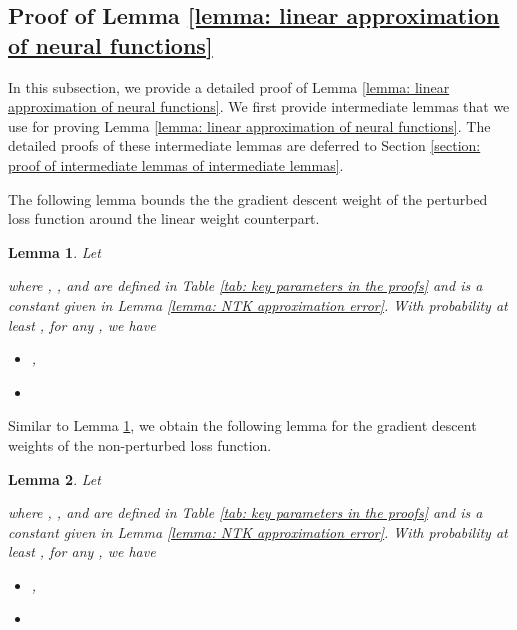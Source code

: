 \documentclass{article} \usepackage{iclr2023/iclr2023_conference,times}
\newtheorem{lemma}{Lemma}[section]
\begin{document}
\subsection{Proof of Lemma \ref{lemma: linear approximation of neural functions}}
\label{subsection: proof of linear approximation lemma}
In this subsection, we provide a detailed proof of Lemma \ref{lemma: linear approximation of neural functions}. We first provide intermediate lemmas that we use for proving Lemma \ref{lemma: linear approximation of neural functions}. The detailed proofs of these intermediate lemmas are deferred to Section \ref{section: proof of intermediate lemmas of intermediate lemmas}. 







The following lemma bounds the the gradient descent weight of the perturbed loss function around the linear weight counterpart. 



\begin{lemma}
Let 

where , ,  and  are defined in Table \ref{tab: key parameters in the proofs} and  is a constant given in Lemma \ref{lemma: NTK approximation error}. 
With probability at least , for any , we have 
\begin{itemize}
    \item , 
    \item 
\end{itemize}
\label{lemma: improve bounding GD weight and that of linear auxilary}
\end{lemma}

Similar to Lemma \ref{lemma: improve bounding GD weight and that of linear auxilary}, we obtain the following lemma for the gradient descent weights of the non-perturbed loss function. 

\begin{lemma}
Let 

where  , ,  and  are defined in Table \ref{tab: key parameters in the proofs} and  is a constant given in Lemma \ref{lemma: NTK approximation error}. 
With probability at least , for any , we have 
\begin{itemize}
    \item , 
    \item 
\end{itemize}
\label{lemma: improved bounding GD weight and that of linear auxilary for non-perturbed loss}
\end{lemma}
\end{document}
